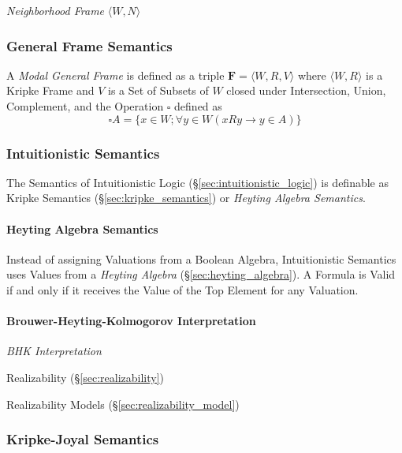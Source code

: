 \emph{Neighborhood Frame} $\langle W, N \rangle$



\subsubsection{General Frame Semantics}
\label{sec:general_frame_semantics}

A \emph{Modal General Frame} is defined as a triple $\mathbf{F} =
\langle W,R,V \rangle$ where $\langle W,R \rangle$ is a Kripke Frame
and $V$ is a Set of Subsets of $W$ closed under Intersection, Union,
Complement, and the Operation $\square$ defined as
\[
    \square A = \{x \in W; \forall y \in W ( x R y \rightarrow y \in A ) \}
\]



\subsubsection{Intuitionistic Semantics}
\label{sec:intuitionistic_semantics}

The Semantics of Intuitionistic Logic
(\S\ref{sec:intuitionistic_logic}) is definable as Kripke Semantics
(\S\ref{sec:kripke_semantics}) or \emph{Heyting Algebra Semantics}.



\paragraph{Heyting Algebra Semantics}\label{sec:heyting_semantics}\hfill

Instead of assigning Valuations from a Boolean Algebra, Intuitionistic
Semantics uses Values from a \emph{Heyting Algebra}
(\S\ref{sec:heyting_algebra}). A Formula is Valid if and only if it
receives the Value of the Top Element for any Valuation.



\paragraph{Brouwer-Heyting-Kolmogorov Interpretation}\hfill
\label{sec:brouwer_heyting_kolmogorov}

\emph{BHK Interpretation}

Realizability (\S\ref{sec:realizability})

Realizability Models (\S\ref{sec:realizability_model})



\subsubsection{Kripke-Joyal Semantics}\label{sec:kripke_joyal}

